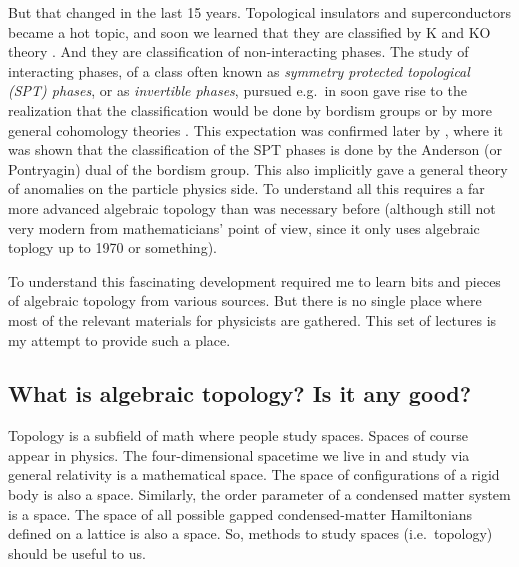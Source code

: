 \documentclass[12pt]{article}
\numberwithin{equation}{section}
\begin{document}
But that changed in the last 15 years. 
Topological insulators and superconductors became a hot topic,
and soon we learned that they are classified by K and KO theory \cite{Schnyder:2008tya,Kitaev:2009mg,Ryu:2010zza}.
And they are classification of non-interacting phases.
The study of interacting phases, of a class often known as \emph{symmetry protected topological (SPT) phases},
or as \emph{invertible phases}, 
pursued e.g.~in \cite{Fidkowski:2009dba,Chen:2011pg,Gu:2012ib,Metlitski:2014xqa} 
soon gave rise to the realization that the classification would be done by bordism groups \cite{Kapustin:2014dxa}
or by more general cohomology theories \cite{KitaevCollapse}.
This expectation was confirmed later by \cite{Freed:2016rqq,Yonekura:2018ufj},
where it was shown that the classification of the SPT phases is done by 
the Anderson (or Pontryagin) dual of the bordism group.
This also implicitly gave a general theory of anomalies on the particle physics side.
To understand all this requires a far more advanced algebraic topology than was necessary before
(although still not very modern from mathematicians' point of view, 
since it only uses algebraic toplogy up to 1970 or something).

To understand this fascinating development required me to learn bits and pieces of algebraic topology 
from various sources. But there is no single place where most of the relevant materials for physicists
are gathered. 
This set of lectures is my attempt to provide such a place.

\subsection{What is algebraic topology? Is it any good?}

Topology is a subfield of math where people study spaces.
Spaces of course appear in physics. 
The four-dimensional spacetime we live in and study via general relativity is a mathematical space.
The space of configurations of a rigid body is also a space.
Similarly, the order parameter of a condensed matter system is a space.
The space of all possible gapped condensed-matter Hamiltonians defined on a lattice 
is also a space.
So, methods to study spaces (i.e.~topology) should be useful to us.
\end{document}
